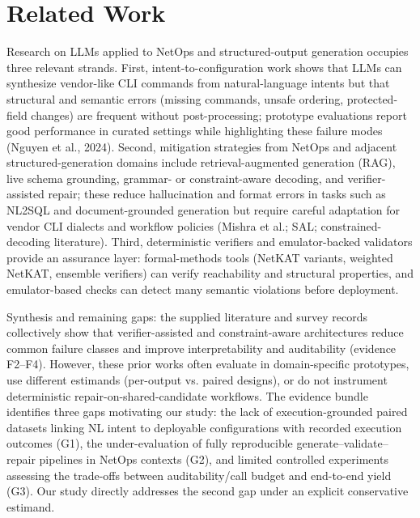 \documentclass[conference]{IEEEtran}
\begin{document}
\section{Related Work}
Research on LLMs applied to NetOps and structured-output generation occupies three relevant strands. First, intent-to-configuration work shows that LLMs can synthesize vendor-like CLI commands from natural-language intents but that structural and semantic errors (missing commands, unsafe ordering, protected-field changes) are frequent without post-processing; prototype evaluations report good performance in curated settings while highlighting these failure modes (Nguyen et al., 2024). Second, mitigation strategies from NetOps and adjacent structured-generation domains include retrieval-augmented generation (RAG), live schema grounding, grammar- or constraint-aware decoding, and verifier-assisted repair; these reduce hallucination and format errors in tasks such as NL2SQL and document-grounded generation but require careful adaptation for vendor CLI dialects and workflow policies (Mishra et al.; SAL; constrained-decoding literature). Third, deterministic verifiers and emulator-backed validators provide an assurance layer: formal-methods tools (NetKAT variants, weighted NetKAT, ensemble verifiers) can verify reachability and structural properties, and emulator-based checks can detect many semantic violations before deployment.

Synthesis and remaining gaps: the supplied literature and survey records collectively show that verifier-assisted and constraint-aware architectures reduce common failure classes and improve interpretability and auditability (evidence F2--F4). However, these prior works often evaluate in domain-specific prototypes, use different estimands (per-output vs. paired designs), or do not instrument deterministic repair-on-shared-candidate workflows. The evidence bundle identifies three gaps motivating our study: the lack of execution-grounded paired datasets linking NL intent to deployable configurations with recorded execution outcomes (G1), the under-evaluation of fully reproducible generate--validate--repair pipelines in NetOps contexts (G2), and limited controlled experiments assessing the trade-offs between auditability/call budget and end-to-end yield (G3). Our study directly addresses the second gap under an explicit conservative estimand.
\end{document}
